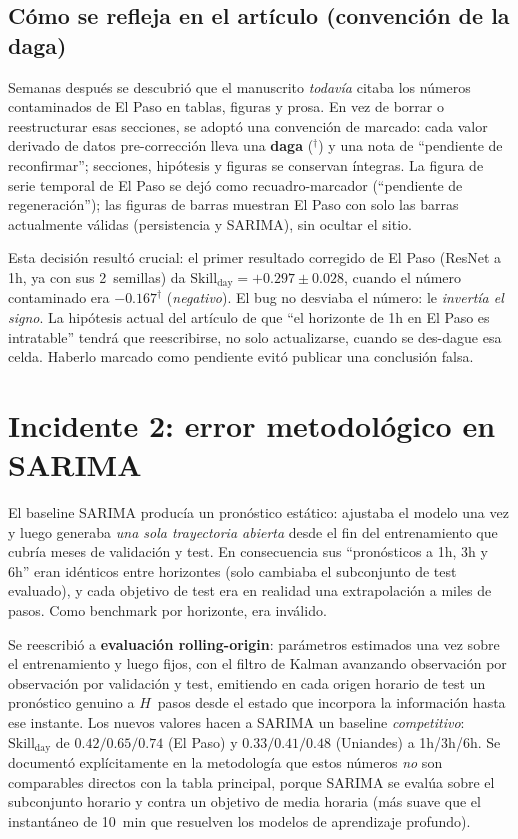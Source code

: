 \documentclass[12pt,a4paper]{article}
\begin{document}
\subsection{Cómo se refleja en el artículo (convención de la daga)}

Semanas después se descubrió que el manuscrito \emph{todavía} citaba los
números contaminados de El Paso en tablas, figuras y prosa. En vez de borrar
o reestructurar esas secciones, se adoptó una convención de marcado: cada
valor derivado de datos pre-corrección lleva una \textbf{daga}
($^\dagger$) y una nota de ``pendiente de reconfirmar''; secciones,
hipótesis y figuras se conservan íntegras. La figura de serie temporal de El
Paso se dejó como recuadro-marcador (``pendiente de regeneración''); las
figuras de barras muestran El Paso con solo las barras actualmente válidas
(persistencia y SARIMA), sin ocultar el sitio.

Esta decisión resultó crucial: el primer resultado corregido de El Paso
(ResNet a 1h, ya con sus 2~semillas) da $\text{Skill}_\text{day} = +0.297
\pm 0.028$, cuando el número contaminado era $-0.167^\dagger$
(\emph{negativo}). El bug no desviaba el número: le \emph{invertía el signo}.
La hipótesis actual del artículo de que ``el horizonte de 1h en El Paso es
intratable'' tendrá que reescribirse, no solo actualizarse, cuando se
des-dague esa celda. Haberlo marcado como pendiente evitó publicar una
conclusión falsa.

\section{Incidente 2: error metodológico en SARIMA}

El baseline SARIMA producía un pronóstico estático: ajustaba el modelo una
vez y luego generaba \emph{una sola trayectoria abierta} desde el fin del
entrenamiento que cubría meses de validación y test. En consecuencia sus
``pronósticos a 1h, 3h y 6h'' eran idénticos entre horizontes (solo cambiaba
el subconjunto de test evaluado), y cada objetivo de test era en realidad una
extrapolación a miles de pasos. Como benchmark por horizonte, era inválido.

Se reescribió a \textbf{evaluación rolling-origin}: parámetros estimados una
vez sobre el entrenamiento y luego fijos, con el filtro de Kalman avanzando
observación por observación por validación y test, emitiendo en cada origen
horario de test un pronóstico genuino a $H$~pasos desde el estado que
incorpora la información hasta ese instante. Los nuevos valores hacen a
SARIMA un baseline \emph{competitivo}: $\text{Skill}_\text{day}$ de
$0.42/0.65/0.74$ (El Paso) y $0.33/0.41/0.48$ (Uniandes) a 1h/3h/6h. Se
documentó explícitamente en la metodología que estos números \emph{no} son
comparables directos con la tabla principal, porque SARIMA se evalúa sobre el
subconjunto horario y contra un objetivo de media horaria (más suave que el
instantáneo de 10~min que resuelven los modelos de aprendizaje profundo).
\end{document}
